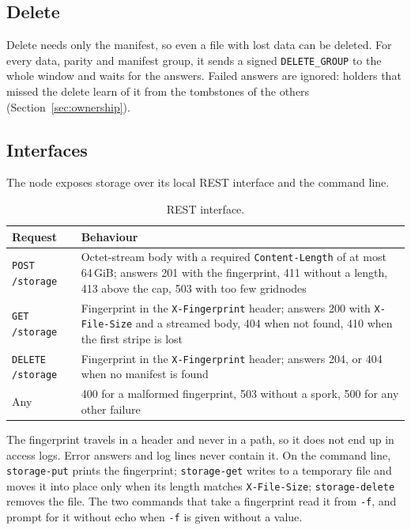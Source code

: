 \documentclass[10pt,a4paper,final]{article}
\newcommand{\code}[1]{\texttt{#1}}
\begin{document}
\subsection{Delete}

Delete needs only the manifest, so even a file with lost data can be deleted. For every data, parity and manifest
group, it sends a signed \code{DELETE\_GROUP} to the whole window and waits for the answers. Failed answers are
ignored: holders that missed the delete learn of it from the tombstones of the others
(Section~\ref{sec:ownership}).

\subsection{Interfaces}

The node exposes storage over its local REST interface and the command line.

\begin{table}[H]
\centering
\small
\begin{tabularx}{\linewidth}{@{}p{2.8cm}L@{}}
\toprule
Request & Behaviour \\
\midrule
\code{POST /storage} & Octet-stream body with a required \code{Content-Length} of at most 64\,GiB; answers 201
with the fingerprint, 411 without a length, 413 above the cap, 503 with too few gridnodes \\
\code{GET /storage} & Fingerprint in the \code{X-Fingerprint} header; answers 200 with \code{X-File-Size} and a
streamed body, 404 when not found, 410 when the first stripe is lost \\
\code{DELETE /storage} & Fingerprint in the \code{X-Fingerprint} header; answers 204, or 404 when no manifest is
found \\
Any & 400 for a malformed fingerprint, 503 without a spork, 500 for any other failure \\
\bottomrule
\end{tabularx}
\caption{REST interface.}
\end{table}

The fingerprint travels in a header and never in a path, so it does not end up in access logs. Error answers and log
lines never contain it. On the command line, \code{storage-put} prints the fingerprint; \code{storage-get} writes to
a temporary file and moves it into place only when its length matches \code{X-File-Size}; \code{storage-delete}
removes the file. The two commands that take a fingerprint read it from \code{-f}, and prompt for it without echo
when \code{-f} is given without a value.
\end{document}

